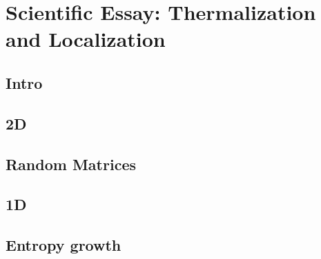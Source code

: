 \setcounter{section}{8}
\setcounter{subsection}{0}


\section{Scientific Essay: Thermalization and Localization}




\subsection{Intro}







\newpage
\subsection{2D}



\newpage
\subsection{Random Matrices}






\newpage
\subsection{1D}





\newpage
\subsection{Entropy growth}







% 









% 





\newpage

\newpage



% 

% 


